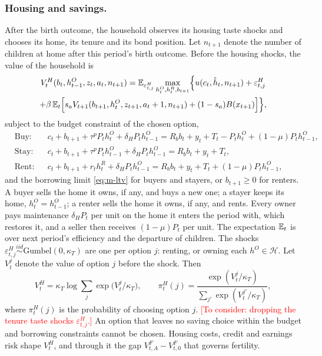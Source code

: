 \subsubsection*{Housing and savings.}
After the birth outcome, the household observes its housing taste shocks and
chooses its home, its tenure and its bond position. Let $n_{t+1}$ denote the
number of children at home after this period's birth outcome. Before the
housing shocks, the value of the household is
\begin{multline}
 V^H_t(b_t,h^O_{t-1},z_t,a_t,n_{t+1})
 =\mathbb E_{\varepsilon^H_{t,j}}\max_{h^O_t,h^R_t,b_{t+1}}
 \Bigl\{u(c_t,\hat h_t,n_{t+1})+\varepsilon^H_{t,j}\\
 +\beta\,\mathbb E_t\Bigl[s_aV_{t+1}(b_{t+1},h^O_t,z_{t+1},a_t+1,n_{t+1})
 +(1-s_a)B(x_{t+1})\Bigr]\Bigr\},
 \label{eq:m-vh}
\end{multline}
subject to the budget constraint of the chosen option,
\begin{equation}
\begin{aligned}
 &\text{Buy:}  && c_t+b_{t+1}+\tau^pP_th^O_t+\delta_HP_th^O_{t-1}=R_bb_t+y_t+T_t-P_th^O_t+(1-\mu)P_th^O_{t-1},\\
 &\text{Stay:} && c_t+b_{t+1}+\tau^pP_th^O_{t-1}+\delta_HP_th^O_{t-1}=R_bb_t+y_t+T_t,\\
 &\text{Rent:} && c_t+b_{t+1}+r_th^R_t+\delta_HP_th^O_{t-1}=R_bb_t+y_t+T_t+(1-\mu)P_th^O_{t-1},
\end{aligned}
 \label{eq:m-budget}
\end{equation}
and the borrowing limit \eqref{eq:m-ltv} for buyers and stayers, or
$b_{t+1}\ge0$ for renters. A buyer sells the home it owns, if any, and buys a
new one; a stayer keeps its home, $h^O_t=h^O_{t-1}$; a renter sells the home
it owns, if any, and rents. Every owner pays maintenance $\delta_HP_t$ per unit on the
home it enters the period with, which restores it, and a seller then receives
$(1-\mu)P_t$ per unit. The expectation $\mathbb E_t$ is over next period's efficiency and the
departure of children. The shocks
$\varepsilon^H_{t,j}\overset{iid}{\sim}\text{Gumbel}(0,\kappa_T)$ are one per
option $j$: renting, or owning each $h^O\in\mathcal H$. Let $V^j_t$ denote the
value of option $j$ before the shock. Then
\begin{equation}
 V^H_t=\kappa_T\log\sum_{j}\exp\bigl(V^j_t/\kappa_T\bigr),
 \qquad
 \pi^H_t(j)=\frac{\exp(V^j_t/\kappa_T)}{\sum_{j'}\exp(V^{j'}_t/\kappa_T)},
 \label{eq:m-tenure}
\end{equation}
where $\pi^H_t(j)$ is the probability of choosing option $j$. \textcolor{red}{[To consider: dropping the
tenure taste shocks $\varepsilon^H_{t,j}$.]} An option that
leaves no saving choice within the budget and borrowing constraints cannot be
chosen. Housing costs, credit and earnings risk shape $V^H_t$, and through it
the gap $V^F_{t,A}-V^F_{t,0}$ that governs fertility.


